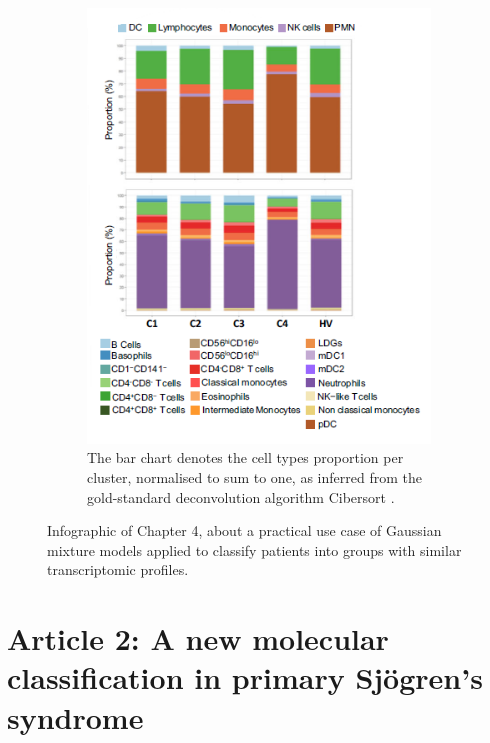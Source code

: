 \documentclass[mainlanguage=english,numlaboratories=2, nofrontcover=true,noaim=false, localbibs, colophon-location=verso-frontcover, oneside, 10pt, localtocs, version=final, nomakeabstract=true]{yathesis}
\begin{document}
{\begin{figure}
\begin{subfigure}[p]{0.35\textwidth}
         \includegraphics[width=\textwidth]{figures/sjogren/cellular_proportions.png}
         \caption[\textbf{Cell population composition in blood samples from the 4 identified clusters.}]{The bar chart denotes the cell types proportion per cluster, normalised to sum to one, as inferred from the gold-standard deconvolution algorithm Cibersort \autocite{newman_etal15}.}
         \label{subfig:cell-population-cibersort}
     \end{subfigure}
    \caption{Infographic of Chapter 4, about a practical use case of Gaussian mixture models applied to classify patients into groups with similar transcriptomic profiles.}
    \label{fig:infographic-sjogren-clustering}
\end{figure}
}

\chapter{Article 2: A new molecular classification in primary Sjögren’s syndrome}
\label{sec:sjogren-clustering}
\end{document}
